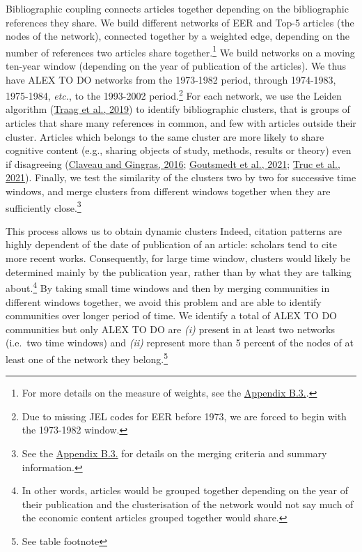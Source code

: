 \documentclass[]{elsarticle} %
\begin{document}
Bibliographic coupling connects articles together depending on the
bibliographic references they share. We build different networks of EER
and Top-5 articles (the nodes of the network), connected together by a
weighted edge, depending on the number of references two articles share
together.\footnote{For more details on the measure of weights, see the
  \protect\hyperlink{network}{Appendix B.3.}.} We build networks on a
moving ten-year window (depending on the year of publication of the
articles). We thus have ALEX TO DO networks from the 1973-1982 period,
through 1974-1983, 1975-1984, \emph{etc.}, to the 1993-2002
period.\footnote{Due to missing JEL codes for EER before 1973, we are
  forced to begin with the 1973-1982 window.} For each network, we use
the Leiden algorithm (\protect\hyperlink{ref-traag2019}{Traag et al.,
2019}) to identify bibliographic clusters, that is groups of articles
that share many references in common, and few with articles outside
their cluster. Articles which belongs to the same cluster are more
likely to share cognitive content (e.g., sharing objects of study,
methods, results or theory) even if disagreeing
(\protect\hyperlink{ref-claveau2016}{Claveau and Gingras, 2016};
\protect\hyperlink{ref-goutsmedt2021}{Goutsmedt et al., 2021};
\protect\hyperlink{ref-truc2021}{Truc et al., 2021}). Finally, we test
the similarity of the clusters two by two for successive time windows,
and merge clusters from different windows together when they are
sufficiently close.\footnote{See the
  \protect\hyperlink{network}{Appendix B.3.} for details on the merging
  criteria and summary information.}

This process allows us to obtain dynamic clusters Indeed, citation
patterns are highly dependent of the date of publication of an article:
scholars tend to cite more recent works. Consequently, for large time
window, clusters would likely be determined mainly by the publication
year, rather than by what they are talking about.\footnote{In other
  words, articles would be grouped together depending on the year of
  their publication and the clusterisation of the network would not say
  much of the economic content articles grouped together would share.}
By taking small time windows and then by merging communities in
different windows together, we avoid this problem and are able to
identify communities over longer period of time. We identify a total of
ALEX TO DO communities but only ALEX TO DO are \emph{(i)} present in at
least two networks (i.e.~two time windows) and \emph{(ii)} represent
more than 5 percent of the nodes of at least one of the network they
belong.\footnote{See table footnote}
\end{document}
